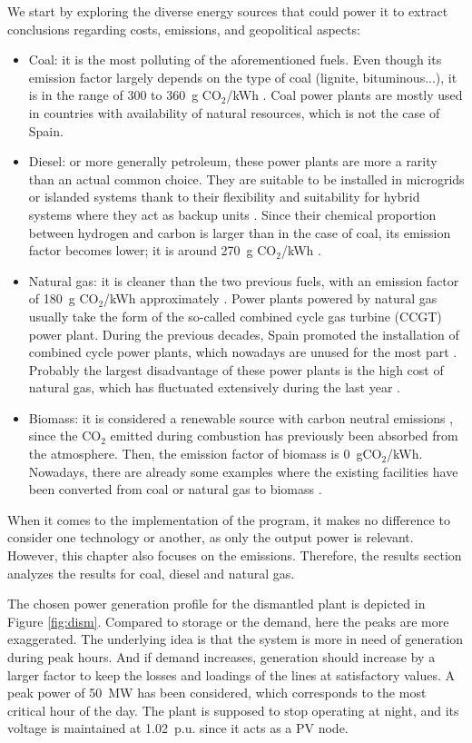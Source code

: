 We start by exploring the diverse energy sources that could power it to extract conclusions regarding costs, emissions, and geopolitical aspects:
\begin{itemize}
  \item Coal: it is the most polluting of the aforementioned fuels. Even though its emission factor largely depends on the type of coal (lignite, bituminous...), it is in the range of 300 to 360~g CO$_2$/kWh \cite{gencat}. Coal power plants are mostly used in countries with availability of natural resources, which is not the case of Spain.
  \item Diesel: or more generally petroleum, these power plants are more a rarity than an actual common choice. They are suitable to be installed in microgrids or islanded systems thank to their flexibility and suitability for hybrid systems where they act as backup units \cite{ismail2013techno}. Since their chemical proportion between hydrogen and carbon is larger than in the case of coal, its emission factor becomes lower; it is around 270~g CO$_2$/kWh \cite{gencat}. 
  \item Natural gas: it is cleaner than the two previous fuels, with an emission factor of 180~g CO$_2$/kWh approximately \cite{gencat}. Power plants powered by natural gas usually take the form of the so-called combined cycle gas turbine (CCGT) power plant. During the previous decades, Spain promoted the installation of combined cycle power plants, which nowadays are unused for the most part \cite{aleasoft}. Probably the largest disadvantage of these power plants is the high cost of natural gas, which has fluctuated extensively during the last year \cite{gascost}. 
  \item Biomass: it is considered a renewable source with carbon neutral emissions \cite{gencat}, since the CO$_2$ emitted during combustion has previously been absorbed from the atmosphere. Then, the emission factor of biomass is 0~gCO$_2$/kWh. Nowadays, there are already some examples where the existing facilities have been converted from coal or natural gas to biomass \cite{grontmij}.
\end{itemize}
When it comes to the implementation of the program, it makes no difference to consider one technology or another, as only the output power is relevant. However, this chapter also focuses on the emissions. Therefore, the results section analyzes the results for coal, diesel and natural gas.

The chosen power generation profile for the dismantled plant is depicted in Figure \ref{fig:dism}. Compared to storage or the demand, here the peaks are more exaggerated. The underlying idea is that the system is more in need of generation during peak hours. And if demand increases, generation should increase by a larger factor to keep the losses and loadings of the lines at satisfactory values. A peak power of 50~MW has been considered, which corresponds to the most critical hour of the day. The plant is supposed to stop operating at night, and its voltage is maintained at 1.02~p.u. since it acts as a PV node.



